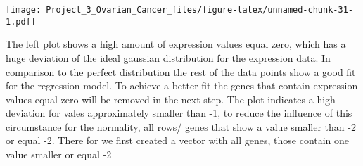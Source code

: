 \documentclass[]{article}
\newenvironment{Shaded}{\begin{snugshade}}{\end{snugshade}}
\newcommand{\CommentTok}[1]{\textcolor[rgb]{0.56,0.35,0.01}{\textit{#1}}}
\newcommand{\DataTypeTok}[1]{\textcolor[rgb]{0.13,0.29,0.53}{#1}}
\newcommand{\DecValTok}[1]{\textcolor[rgb]{0.00,0.00,0.81}{#1}}
\newcommand{\KeywordTok}[1]{\textcolor[rgb]{0.13,0.29,0.53}{\textbf{#1}}}
\newcommand{\NormalTok}[1]{#1}
\newcommand{\OperatorTok}[1]{\textcolor[rgb]{0.81,0.36,0.00}{\textbf{#1}}}
\newcommand{\StringTok}[1]{\textcolor[rgb]{0.31,0.60,0.02}{#1}}
\begin{document}
\begin{Shaded}
\end{Shaded}

\texttt{[image: Project\_3\_Ovarian\_Cancer\_files/figure-latex/unnamed-chunk-31-1.pdf]}

The left plot shows a high amount of expression values equal zero, which
has a huge deviation of the ideal gaussian distribution for the
expression data. In comparison to the perfect distribution the rest of
the data points show a good fit for the regression model. To achieve a
better fit the genes that contain expression values equal zero will be
removed in the next step. The plot indicates a high deviation for vales
approximately smaller than -1, to reduce the influence of this
circumstance for the normality, all rows/ genes that show a value
smaller than -2 or equal -2. There for we first created a vector with
all genes, those contain one value smaller or equal -2

\begin{Shaded}
\end{Shaded}
\end{document}
